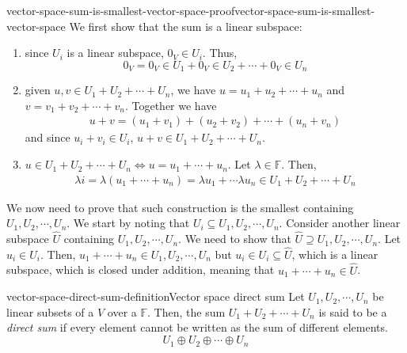 \documentclass[preview]{standalone}
\begin{document}
\begin{snippetproof}{vector-space-sum-is-smallest-vector-space-proof}{vector-space-sum-is-smallest-vector-space}{}
    We first show that the sum is a linear subspace:
    \begin{enumerate}
        \item since \(U_i\) is a linear subspace, \(0_V \in U_i\).
        Thus,
        \[
            0_V = 0_V \in U_1 + 0_V \in U_2 + \cdots + 0_V \in U_n
        \]
        \item given \(u,v \in U_1 + U_2 + \cdots + U_n\), we have
        \(u=u_1 + u_2 + \cdots + u_n\) and \(v=v_1 + v_2 + \cdots + v_n\). Together we have
        \begin{align*}
            u + v = (u_1 + v_1) + (u_2 + v_2) + \cdots + (u_n + v_n)
        \end{align*}
        and since \(u_i + v_i \in U_i\), \(u+v \in U_1 + U_2 + \cdots + U_n\).
        \item \(u \in U_1 + U_2 + \cdots + U_n \iff u = u_1 + \cdots + u_n\).
        Let \(\lambda \in \mathbb{F}\). Then,
        \begin{align*}
            \lambda i = \lambda (u_1 + \cdots + u_n) = \lambda u_1 + \cdots \lambda u_n \in
            U_1 + U_2 + \cdots + U_n
        \end{align*}
    \end{enumerate}
    We now need to prove that such construction is the smallest \vectorspace containing \(U_1, U_2, \cdots, U_n\).
    We start by noting that \(U_i \subseteq U_1, U_2, \cdots, U_n\).
    Consider another linear subspace \(\hat{U}\) containing \(U_1, U_2, \cdots, U_n\).
    We need to show that \(\hat{U} \supseteq U_1, U_2, \cdots, U_n\).
    Let \(u_i \in U_i\). Then, \(u_1 + \cdots + u_n \in U_1, U_2, \cdots, U_n\)
    but \(u_i \in U_i \subseteq \hat{U}\), which is a linear subspace, which is closed under addition,
    meaning that \(u_1 + \cdots + u_n \in \hat{U}\).
\end{snippetproof}


\begin{snippetdefinition}{vector-space-direct-sum-definition}{Vector space direct sum}
    Let \(U_1, U_2, \cdots, U_n\) be linear subsets of a \vectorspace \(V\)
    over a \field \(\mathbb{F}\). Then, the sum \(U_1 + U_2 + \cdots + U_n\)
    is said to be a \emph{direct sum} if every element cannot be written as the sum of different elements.
    \[
        U_1 \oplus U_2 \oplus \cdots \oplus U_n
    \]
\end{snippetdefinition}
\end{document}
